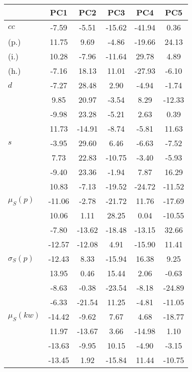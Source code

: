\begin{table}[h!]
\begin{center}
\begin{tabular}{| l | c | c | c | c | c |}\hline
 & PC1 & PC2 & PC3 & PC4 & PC5 \\\hline
$cc$ & -7.59  & -5.51  & -15.62  & -41.94  & 0.36 \\\hline
(p.) & 11.75  & 9.69  & -4.86  & -19.66  & 24.13 \\\hline
(i.) & 10.28  & -7.96  & -11.64  & 29.78  & 4.89 \\\hline
(h.) & -7.16  & 18.13  & 11.01  & -27.93  & -6.10 \\\hline
$d$ & -7.27  & 28.48  & 2.90  & -4.94  & -1.74 \\\hline
 & 9.85  & 20.97  & -3.54  & 8.29  & -12.33 \\\hline
 & -9.98  & 23.28  & -5.21  & 2.63  & 0.39 \\\hline
 & 11.73  & -14.91  & -8.74  & -5.81  & 11.63 \\\hline
$s$ & -3.95  & 29.60  & 6.46  & -6.63  & -7.52 \\\hline
 & 7.73  & 22.83  & -10.75  & -3.40  & -5.93 \\\hline
 & -9.40  & 23.36  & -1.94  & 7.87  & 16.29 \\\hline
 & 10.83  & -7.13  & -19.52  & -24.72  & -11.52 \\\hline
$\mu_S(p)$ & -11.06  & -2.78  & -21.72  & 11.76  & -17.69 \\\hline
 & 10.06  & 1.11  & 28.25  & 0.04  & -10.55 \\\hline
 & -7.80  & -13.62  & -18.48  & -13.15  & 32.66 \\\hline
 & -12.57  & -12.08  & 4.91  & -15.90  & 11.41 \\\hline
$\sigma_S(p)$ & -12.43  & 8.33  & -15.94  & 16.38  & 9.25 \\\hline
 & 13.95  & 0.46  & 15.44  & 2.06  & -0.63 \\\hline
 & -8.63  & -0.38  & -23.54  & -8.18  & -24.89 \\\hline
 & -6.33  & -21.54  & 11.25  & -4.81  & -11.05 \\\hline
$\mu_S(kw)$ & -14.42  & -9.62  & 7.67  & 4.68  & -18.77 \\\hline
 & 11.97  & -13.67  & 3.66  & -14.98  & 1.10 \\\hline
 & -13.63  & -9.95  & 10.15  & -4.90  & -3.15 \\\hline
 & -13.45  & 1.92  & -15.84  & 11.44  & -10.75 \\\hline

\end{tabular}
\end{center}
\end{table}
